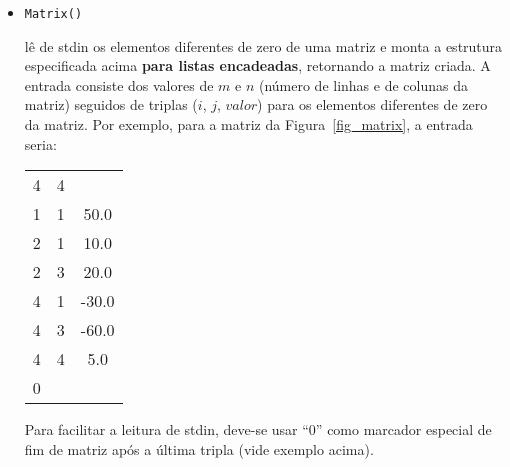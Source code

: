 \documentclass[a4paper,10pt]{article}
\begin{document}
\begin{itemize}
  \item[] \begin{verbatim}Matrix()\end{verbatim} lê de stdin os elementos diferentes de zero de uma matriz e monta a estrutura especificada acima \textbf{para listas encadeadas}, retornando a matriz criada. A entrada consiste dos valores de $m$ e $n$ (número de linhas e de colunas da matriz) seguidos de triplas ($i$, $j$, $valor$) para os elementos diferentes de zero da matriz. Por exemplo, para a matriz da Figura~\ref{fig_matrix}, a entrada seria:
  
\begin{tabular}{c c c}
4 & 4 & \\
1 & 1 & 50.0 \\
2 & 1 & 10.0 \\
2 & 3 & 20.0 \\
4 & 1 & -30.0 \\
4 & 3 & -60.0 \\
4 & 4 & 5.0 \\
0 &   & \\
\end{tabular}

  Para facilitar a leitura de stdin, deve-se usar ``0'' como marcador especial de fim de matriz após a última tripla (vide exemplo acima).



\end{itemize}
\end{document}
